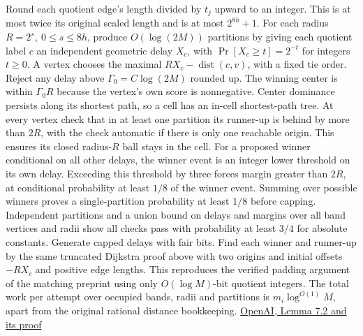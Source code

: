 \documentclass[11pt]{article}
\begin{document}
Round each quotient edge's length divided by \(t_j\) upward to an integer. This is at most twice its original scaled length and is at most \(2^{8h}+1\). For each radius \(R=2^s,\ 0\le s\le8h\), produce \(O(\log(2M))\) partitions by giving each quotient label \(c\) an independent geometric delay \(X_c\), with \(\Pr[X_c\ge t]=2^{-t}\) for integers \(t\ge0\). A vertex chooses the maximal \(R X_c-\operatorname{dist}(c,v)\), with a fixed tie order. Reject any delay above \(\Gamma_0=C\log(2M)\) rounded up. The winning center is within \(\Gamma_0 R\) because the vertex's own score is nonnegative. Center dominance persists along its shortest path, so a cell has an in-cell shortest-path tree. At every vertex check that in at least one partition its runner-up is behind by more than \(2R\), with the check automatic if there is only one reachable origin. This ensures its closed radius-\(R\) ball stays in the cell. For a proposed winner conditional on all other delays, the winner event is an integer lower threshold on its own delay. Exceeding this threshold by three forces margin greater than \(2R\), at conditional probability at least \(1/8\) of the winner event. Summing over possible winners proves a single-partition probability at least \(1/8\) before capping. Independent partitions and a union bound on delays and margins over all band vertices and radii show all checks pass with probability at least \(3/4\) for absolute constants. Generate capped delays with fair bits. Find each winner and runner-up by the same truncated Dijkstra proof above with two origins and initial offsets \(-RX_c\) and positive edge lengths. This reproduces the verified padding argument of the matching preprint using only \(O(\log M)\)-bit quotient integers. The total work per attempt over occupied bands, radii and partitions is \(m_i\log^{O(1)}M\), apart from the original rational distance bookkeeping. \href{https://raw.githubusercontent.com/openai/math/adc7f1241b42e322a6451854ab7e4b4c146bf78a/preprints/Almost-Linear-Time-Maximum-Cardinality-Matching-in-Sparse-General-Graphs-September-24-2026/main.pdf\#page=54}{OpenAI, Lemma 7.2 and its proof}
\end{document}
